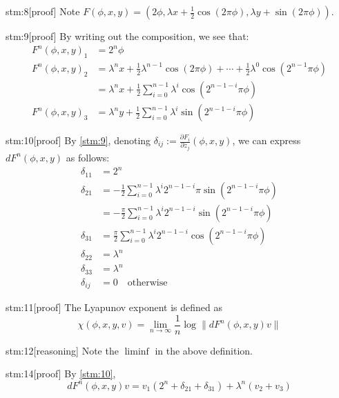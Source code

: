 \begin{stm}{stm:8}[proof]
Note $F(\phi, x, y) = (2\phi, \lambda x + \frac{1}{2} \cos(2\pi\phi), \lambda y + \sin(2\pi\phi))$.
\end{stm}

\begin{stm}{stm:9}[proof]
By writing out the composition, we see that:
\begin{align*}
F^n(\phi, x, y)_1 &= 2^n \phi \\
F^n(\phi, x, y)_2 &= \lambda^n x + \frac{1}{2} \lambda^{n-1} \cos(2\pi \phi) + \cdots + \frac{1}{2} \lambda^0 \cos(2^{n-1} \pi \phi) \\
&= \lambda^n x + \frac{1}{2} \sum_{i=0}^{n-1} \lambda^i \cos(2^{n-1-i} \pi \phi) \\
F^n(\phi, x, y)_3 &= \lambda^n y + \frac{1}{2} \sum_{i=0}^{n-1} \lambda^i \sin(2^{n-1-i} \pi \phi)
\end{align*}
\end{stm}


\begin{stm}{stm:10}[proof]
By \ref{stm:9}, denoting $\delta_{ij} := \frac{\partial F_i}{\partial z_j}(\phi, x, y)$, we can express $dF^n(\phi, x, y)$ as follows:
\begin{align*}
\delta_{11} &= 2^n \\
\delta_{21} &= -\frac{1}{2} \sum_{i=0}^{n-1} \lambda^i 2^{n-1-i} \pi \sin(2^{n-1-i} \pi \phi) \\
&= -\frac{\pi}{2} \sum_{i=0}^{n-1} \lambda^i 2^{n-1-i} \sin(2^{n-1-i} \pi \phi) \\
\delta_{31} &= \frac{\pi}{2} \sum_{i=0}^{n-1} \lambda^i 2^{n-1-i} \cos(2^{n-1-i} \pi \phi) \\
\delta_{22} &= \lambda^n \\
\delta_{33} &= \lambda^n \\
\delta_{ij} &= 0 \quad \text{otherwise}
\end{align*}
\end{stm}


\begin{stm}{stm:11}[proof]
The Lyapunov exponent is defined as
\[
\chi(\phi, x, y, v) = \lim_{n \to \infty} \frac{1}{n} \log \| dF^n(\phi, x, y)v \|
\]
\end{stm}

\begin{stm}{stm:12}[reasoning]
Note the $\liminf$ in the above definition.
\end{stm}

\begin{stm}{stm:14}[proof]
By \ref{stm:10},
\[
dF^n(\phi, x, y)v = v_1 (2^n + \delta_{21} + \delta_{31}) + \lambda^n (v_2 + v_3)
\]
\end{stm}

